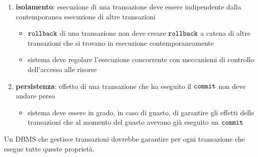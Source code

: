 \begin{enumerate}[itemsep=\smallskipamount]
  Questo implica:
  \begin{itemize}[label=$\diamond$, itemsep=\smallskipamount]
    \item verifica immediata:
    \begin{itemize}[itemsep=\smallskipamount]
      \item fatta nel corso della transazione
      \item viene abortita solo l’ultima operazione e il sistema restituisce all’applicazione una segnalazione d’errore
      \item applicazione può reagire alla violazione
    \end{itemize}
    \item verifica differita:
    \begin{itemize}[itemsep=\smallskipamount]
      \item  al $\verb|commit|$, se un vincolo di integrità viene violato, la transazione viene abortita senza possibilità da parte dell’applicazione di reagire alla violazione
    \end{itemize}
  \end{itemize}
  \item \textcolor{azzurrino}{\textbf{isolamento}}: esecuzione di una transazione deve essere indipendente dalla contemporanea esecuzione di altre transazioni
  \begin{itemize}[label=$\diamond$, itemsep=\smallskipamount]
    \item $\verb|rollback|$ di una transazione non deve creare $\verb|rollback|$ a catena di altre transazioni che si trovano in esecuzione contemporaneamente
    \item  sistema deve regolare l’esecuzione concorrente con meccanismi di controllo dell’accesso alle risorse
  \end{itemize}
  \item \textcolor{azzurrino}{\textbf{persistenza}}: effetto di una transazione che ha eseguito il $\verb|commit|$ non deve andare perso
  \begin{itemize}[label=$\diamond$, itemsep=\smallskipamount]
    \item sistema deve essere in grado, in caso di guasto, di garantire gli effetti delle transazioni che al momento del guasto avevano già eseguito un $\verb|commit|$
  \end{itemize}
\end{enumerate}

\smallskip
Un DBMS che gestisce transazioni dovrebbe garantire per ogni transazione che esegue tutte queste proprietà.

